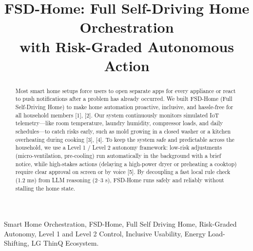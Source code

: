 \documentclass[conference]{IEEEtran}
\begin{document}
\title{FSD-Home: Full Self-Driving Home Orchestration\\ with Risk-Graded Autonomous Action}

\author{
}
\maketitle

\begin{abstract}
Most smart home setups force users to open separate apps for every appliance or
react to push notifications after a problem has already occurred. We built
FSD-Home (Full Self-Driving Home) to make home automation proactive, inclusive,
and hassle-free for all household members [1], [2]. Our system continuously
monitors simulated IoT telemetry---like room temperature, laundry humidity,
compressor loads, and daily schedules---to catch risks early, such as mold
growing in a closed washer or a kitchen overheating during cooking [3], [4]. To
keep the system safe and predictable across the household, we use a Level 1 /
Level 2 autonomy framework: low-risk adjustments (micro-ventilation,
pre-cooling) run automatically in the background with a brief notice, while
high-stakes actions (delaying a high-power dryer or preheating a cooktop)
require clear approval on screen or by voice [5]. By decoupling a fast local
rule check (1.2 ms) from LLM reasoning (2--3 s), FSD-Home runs safely and
reliably without stalling the home state.
\end{abstract}

\begin{IEEEkeywords}
Smart Home Orchestration, FSD-Home, Full Self Driving Home, Risk-Graded
Autonomy, Level 1 and Level 2 Control, Inclusive Usability, Energy
Load-Shifting, LG ThinQ Ecosystem.
\end{IEEEkeywords}
\end{document}

